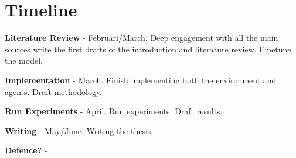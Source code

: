 \section{Timeline}
%
%
%
%
%
%
%
%
%
%


\textbf{Literature Review} - Februari/March. Deep engagement with all the main sources write the first drafts of the introduction and literature review. Finetune the model.

\textbf{Implementation} - March. Finish implementing both the environment and agents. Draft methodology.

\textbf{Run Experiments} - April. Run experiments. Draft results.

\textbf{Writing} - May/June. Writing the thesis.

\textbf{Defence?} - 
